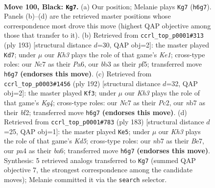 \documentclass[11pt]{article}
\begin{document}
\clearpage

\begin{figure}[p]\centering
\begin{subfigure}{0.46\textwidth}\centering
\resizebox{\linewidth}{!}{%
\newchessgame
\chessboard[
  setfen={8/1Nn5/7k/8/Pp2P2n/1B2p3/1K3b1p/8 b - - 9 100},
  showmover=false,
  pgfstyle=straightmove, color=movearrow, markmove={h6-g7}
]}
\caption{}
\end{subfigure}\hfill
\begin{subfigure}{0.46\textwidth}\centering
\resizebox{\linewidth}{!}{%
\newchessgame
\chessboard[
  setfen={4k3/8/p1p2p2/P3pP2/6K1/Bp6/1N1n4/8 b - - 5 97},
  showmover=false,
  pgfstyle=straightmove, color=movearrow, markmove={e8-d7}
]}
\caption{}
\end{subfigure}
\\[4pt]
\begin{subfigure}{0.46\textwidth}\centering
\resizebox{\linewidth}{!}{%
\newchessgame
\chessboard[
  setfen={8/8/6B1/p2k4/P2p2K1/3P4/2P2b2/8 w - - 55 97},
  showmover=false,
  pgfstyle=straightmove, color=movearrow, markmove={g4-f3}
]}
\caption{}
\end{subfigure}\hfill
\begin{subfigure}{0.46\textwidth}\centering
\resizebox{\linewidth}{!}{%
\newchessgame
\chessboard[
  setfen={8/4b3/B7/8/1p1k3p/2n2K2/2P3P1/2B5 b - - 82 92},
  showmover=false,
  pgfstyle=straightmove, color=movearrow, markmove={d4-e5}
]}
\caption{}
\end{subfigure}
\caption{\textbf{Move 100, Black: \texttt{Kg7}.} (a) Our position; Melanie plays \texttt{Kg7} (\texttt{h6g7}). Panels (b)--(d) are the retrieved master positions whose correspondence most drove this move (highest QAP objective among those that transfer to it). (b) Retrieved from \texttt{ccrl\_top\_p0001\#313} (ply 193) [structural distance $d$=30, QAP obj=2]: the master played \texttt{Kd7}; under $\mu$ our \emph{Kh3} plays the role of that game's \emph{Ke1}; cross-type roles: our \emph{N}c7 as their \emph{P}a6, our \emph{b}b3 as their \emph{p}f5; transferred move \texttt{h6g7} \textbf{(endorses this move)}. (c) Retrieved from \texttt{ccrl\_top\_p0003\#1456} (ply 192) [structural distance $d$=32, QAP obj=2]: the master played \texttt{Kf3}; under $\mu$ our \emph{Kh3} plays the role of that game's \emph{Kg4}; cross-type roles: our \emph{N}c7 as their \emph{P}c2, our \emph{n}b7 as their \emph{b}f2; transferred move \texttt{h6g7} \textbf{(endorses this move)}. (d) Retrieved from \texttt{ccrl\_top\_p0001\#783} (ply 183) [structural distance $d$=25, QAP obj=1]: the master played \texttt{Ke5}; under $\mu$ our \emph{Kh3} plays the role of that game's \emph{Kd5}; cross-type roles: our \emph{n}b7 as their \emph{B}e7, our \emph{p}a4 as their \emph{b}a6; transferred move \texttt{h6g7} \textbf{(endorses this move)}. Synthesis: 5 retrieved analogs transferred to \texttt{Kg7} (summed QAP objective 7, the strongest correspondence among the candidate moves); Melanie committed it via the \texttt{search} selector.}
\label{fig:thought-m199}
\end{figure}
\end{document}
